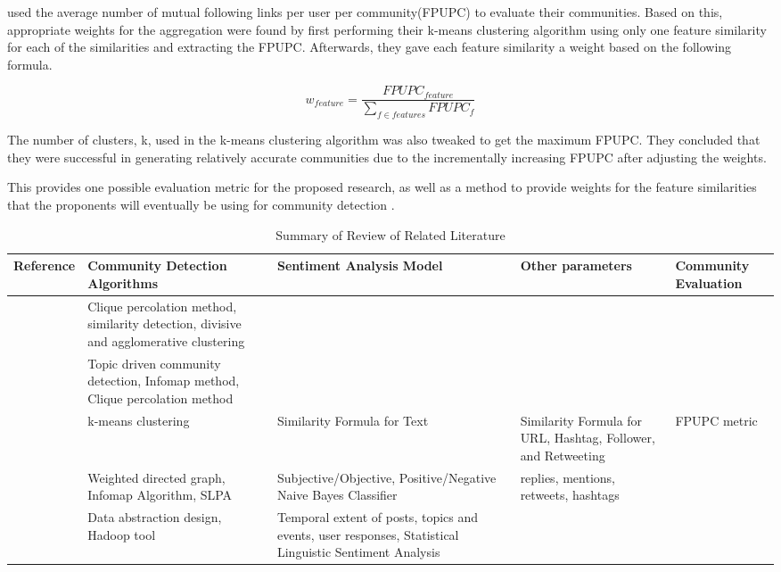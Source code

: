  used the average number of mutual following links per user per community(FPUPC) to evaluate their communities. Based on this, appropriate weights for the aggregation were found by first performing their k-means clustering algorithm using only one feature similarity for each of the similarities and extracting the FPUPC. Afterwards, they gave each feature similarity a weight based on the following formula. 

\begin{equation}
w_{feature} = \frac{FPUPC_{feature}}{\sum_{f \in features} FPUPC_f}
\end{equation}

The number of clusters, k, used in the k-means clustering algorithm was also tweaked to get the maximum FPUPC. They concluded that they were successful in generating relatively accurate communities due to the incrementally increasing FPUPC after adjusting the weights.

This provides one possible evaluation metric for the proposed research, as well as a method to provide weights for the feature similarities that the proponents will eventually be using for community detection \cite{Zhang:2012}.
\begin{landscape}
	\begin{table}
		\centering
		\caption {Summary of Review of Related Literature}
		\begin{tabu}{| X[l] | X[l] | X[l] | X[l] | X[l] |}
			\hline
			Reference & Community Detection Algorithms & Sentiment Analysis Model & Other parameters & Community Evaluation \\
			\hline
			\cite{Tang:2010} & Clique percolation method, similarity detection, divisive and agglomerative clustering & & & \\
			\hline
			\cite{Lim:2012:1} & Topic driven community detection, Infomap method, Clique percolation method & & & \\
			\hline
			\cite{Zhang:2012} & k-means clustering & Similarity Formula for Text & Similarity Formula for URL, Hashtag, Follower, and Retweeting & FPUPC metric \\
			\hline
			\cite{Deitrick:2013} & Weighted directed graph, Infomap Algorithm, SLPA & Subjective/Objective, Positive/Negative Naive Bayes Classifier & replies, mentions, retweets, hashtags & \\
			\hline
			\cite{Cao:2015} & Data abstraction design, Hadoop tool & Temporal extent of posts, topics and events, user responses, Statistical Linguistic Sentiment Analysis & & \\
			\hline
		\end{tabu}
	\end{table}
\end{landscape}